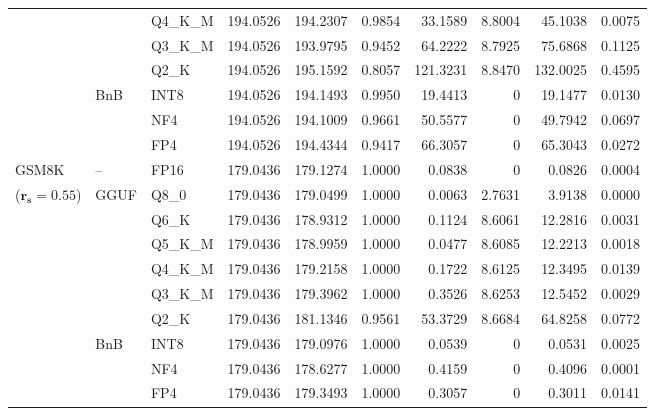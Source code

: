 \begin{table}[t]
{\begin{tabular}{ll l rrrrrrr}
 &  & Q4\_K\_M & 194.0526 & 194.2307 & 0.9854 & 33.1589 & 8.8004 & 45.1038 & 0.0075 \\
 &  & Q3\_K\_M & 194.0526 & 193.9795 & \cellcolor{red!18} 0.9452 & \cellcolor{red!18} 64.2222 & 8.7925 & \cellcolor{red!18} 75.6868 & \cellcolor{red!18} 0.1125 \\
 &  & Q2\_K & 194.0526 & 195.1592 & \cellcolor{red!18} 0.8057 & \cellcolor{red!18} 121.3231 & 8.8470 & \cellcolor{red!18} 132.0025 & \cellcolor{red!18} 0.4595 \\
 & BnB & INT8 & 194.0526 & 194.1493 & 0.9950 & 19.4413 & \cellcolor{cyan!12} $0$ & 19.1477 & 0.0130 \\
 &  & NF4 & 194.0526 & 194.1009 & 0.9661 & 50.5577 & \cellcolor{cyan!12} $0$ & 49.7942 & 0.0697 \\
 &  & FP4 & 194.0526 & 194.4344 & \cellcolor{red!18} 0.9417 & \cellcolor{red!18} 66.3057 & \cellcolor{cyan!12} $0$ & \cellcolor{red!18} 65.3043 & \cellcolor{red!18} 0.0272 \\
\midrule
GSM8K & -- & FP16 & 179.0436 & 179.1274 & 1.0000 & 0.0838 & \cellcolor{cyan!12} $0$ & 0.0826 & 0.0004 \\
{\small ($\mathbf{r_s{=}0.55}$)} & GGUF & Q8\_0 & 179.0436 & 179.0499 & 1.0000 & 0.0063 & 2.7631 & 3.9138 & 0.0000 \\
 &  & Q6\_K & 179.0436 & 178.9312 & 1.0000 & 0.1124 & 8.6061 & 12.2816 & 0.0031 \\
 &  & Q5\_K\_M & 179.0436 & 178.9959 & 1.0000 & 0.0477 & 8.6085 & 12.2213 & 0.0018 \\
 &  & Q4\_K\_M & 179.0436 & 179.2158 & 1.0000 & 0.1722 & 8.6125 & 12.3495 & 0.0139 \\
 &  & Q3\_K\_M & 179.0436 & 179.3962 & 1.0000 & 0.3526 & 8.6253 & 12.5452 & 0.0029 \\
 &  & Q2\_K & 179.0436 & 181.1346 & 0.9561 & 53.3729 & 8.6684 & 64.8258 & 0.0772 \\
 & BnB & INT8 & 179.0436 & 179.0976 & 1.0000 & 0.0539 & \cellcolor{cyan!12} $0$ & 0.0531 & 0.0025 \\
 &  & NF4 & 179.0436 & 178.6277 & 1.0000 & 0.4159 & \cellcolor{cyan!12} $0$ & 0.4096 & 0.0001 \\
 &  & FP4 & 179.0436 & 179.3493 & 1.0000 & 0.3057 & \cellcolor{cyan!12} $0$ & 0.3011 & 0.0141 \\
\bottomrule
\end{tabular}}
\end{table}